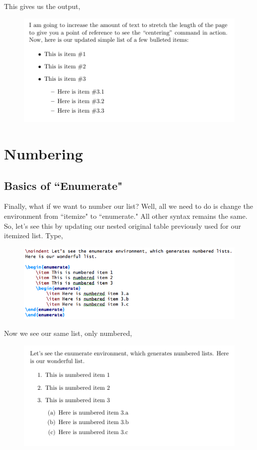 \documentclass[11pt]{article}
\newcommand{\forceindent}{\leavevmode{\parindent=1.5em\indent}} %
\begin{document}
This gives us the output, \\

\begin{figure}[!h]
	\includegraphics[scale=.6]{OUT10} \\
	\centering
\end{figure}

\newpage 

\section{Numbering}

\subsection{Basics of ``Enumerate"}

\forceindent Finally, what if we want to number our list? Well, all we need to do is change the environment from ``itemize" to ``enumerate." All other syntax remains the same. So, let's see this by updating our nested original table previously used for our itemized list. Type,

\begin{figure}[!h]
	\includegraphics[scale=.6]{CODE11} \\
	\centering
\end{figure}

Now we see our same list, only numbered, \\

\begin{figure}[!h]
	\includegraphics[scale=.6]{OUT11} \\
	\centering
\end{figure}
\end{document}
